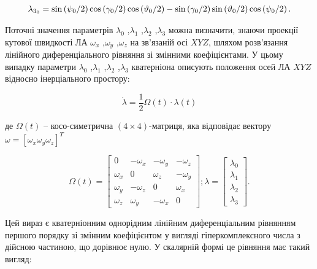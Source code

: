 \[\begin{array}{l}
{\lambda_{3_{0}} =\sin  \left({\psi_{0}  \mathord{\left/{\vphantom{
\psi_{0}  2}}\right.\kern-\nulldelimiterspace} 2} \right)\cos  \left({\gamma_{0}  
\mathord{\left/{\vphantom{\gamma_{0}  2}}\right.\kern-\nulldelimiterspace} 2} \right)
\cos  \left({\vartheta_{0}  \mathord{\left/{\vphantom{\vartheta_{0}  2}}\right.
\kern-\nulldelimiterspace} 2} \right)-\sin  \left({\gamma_{0}  \mathord{\left/{
\vphantom{\gamma_{0}  2}}\right.\kern-\nulldelimiterspace} 2} \right)\sin  \left({
\vartheta_{0}  \mathord{\left/{\vphantom{\vartheta_{0}  2}}\right.\kern-\nulldelimiterspace} 
2} \right)\cos  \left({\psi_{0}  \mathord{\left/{\vphantom{\psi_{0}  2}}\right.
\kern-\nulldelimiterspace} 2} \right).} \end{array}\] 

Поточні значення параметрів $\lambda_{0}$ ,$\lambda_{1}$ ,$\lambda_{2}$ ,$\lambda_{3}$ можна 
визначити, знаючи проекції кутової швидкості ЛА $\omega_{x}$ ,$\omega_{y}$ ,$\omega_{z}$ 
на зв'язаній осі $XYZ$, шляхом розв'язання лінійного диференціального рівняння 
зі змінними коефіцієнтами. У цьому випадку параметри $\lambda_{0}$ ,$\lambda_{1}$ 
,$\lambda_{2}$ ,$\lambda_{3}$ кватерніона  описують  положення  осей ЛА  $XYZ$  відносно  
інерціального простору:

\[\dot{\lambda }=\frac{1}{2} \Omega(t)\cdot \lambda(t)\] 
\begin{ESKDexplanation}
\item де $\Omega(t)$ -- косо-симетрична $(4\times 4)$-матриця, яка 
відповідає вектору $\omega =[\omega_{x} \omega_{y} \omega_{z}]^{T}  $
\end{ESKDexplanation}
\[\Omega (t)=\left[
\begin{array}{cccc} 
  {0} & {-\omega_{x}} & {-\omega_{y}} & {-\omega_{z}} \\ 
  {\omega_{x}} & {0} & {\omega_{z}} & {-\omega_{y}} \\ 
  {\omega_{y}} & {-\omega_{z}} & {0} & {\omega_{x}} \\ 
  {\omega_{z}} & {\omega_{y}} & {-\omega_{x}} & {0} 
\end{array}\right];
\lambda =\left[\begin{array}{c} 
  {\lambda_{0}} \\ 
  {\lambda_{1}} \\ 
  {\lambda_{2}} \\ 
  {\lambda_{3}} 
\end{array}
\right].\] 

Цей вираз є кватерніонним однорідним лінійним диференціальним рівнянням першого порядку 
зі змінним коефіцієнтом у вигляді гіперкомплексного числа з дійсною частиною, що 
дорівнює нулю. У скалярній формі це рівняння  має такий вигляд:

